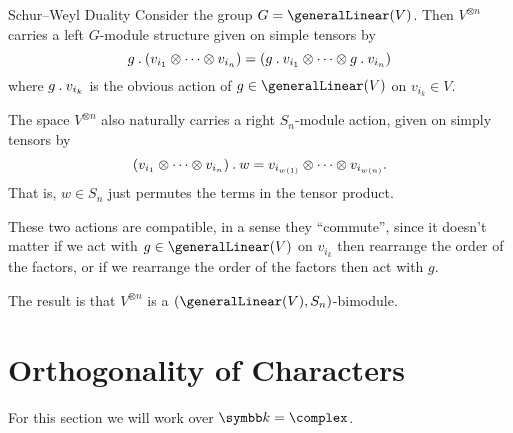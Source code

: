 \begin{exm}{Schur--Weyl Duality}{}
    Consider the group \(G = \generalLinear(V)\).
    Then \(V^{\otimes n}\) carries a left \(G\)-module structure given on simple tensors by
    \begin{equation}
        g \mathbin{.} (v_{i_1} \otimes \dotsb \otimes v_{i_n}) = (g \mathbin{.} v_{i_1} \otimes \dotsb \otimes g \mathbin{.} v_{i_n})
    \end{equation}
    where \(g \mathbin{.} v_{i_k}\) is the obvious action of \(g \in \generalLinear(V)\) on \(v_{i_k} \in V\).
    
    The space \(V^{\otimes n}\) also naturally carries a right \(S_n\)-module action, given on simply tensors by
    \begin{equation}
        (v_{i_1} \otimes \dotsb \otimes v_{i_n}) \mathbin{.} w = v_{i_{w(1)}} \otimes \dotsb \otimes v_{i_{w(n)}}.
    \end{equation}
    That is, \(w \in S_n\) just permutes the terms in the tensor product.
    
    These two actions are compatible, in a sense they \enquote{commute}, since it doesn't matter if we act with \(g \in \generalLinear(V)\) on \(v_{i_k}\) then rearrange the order of the factors, or if we rearrange the order of the factors then act with \(g\).
    
    The result is that \(V^{\otimes n}\) is a \((\generalLinear(V), S_n)\)-bimodule.
\end{exm}

\section{Orthogonality of Characters}
For this section we will work over \(\field = \complex\).

